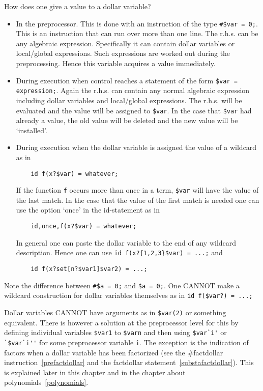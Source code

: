 How does one give a value to a dollar variable?
\begin{itemize}
\item In the preprocessor. This is done with an instruction of the type 
\verb:#$var = 0;:. This is an instruction that can run over more than one 
line. The r.h.s. can be any algebraic expression. Specifically it can 
contain dollar variables or local/global expressions. Such 
expressions are worked out during the preprocessing. Hence this variable 
acquires a value immediately.
\item During execution when control reaches a statement of the form 
\verb:$var = expression;:. Again the r.h.s. can contain any normal 
algebraic expression including dollar variables and local/global 
expressions. The r.h.s. will be evaluated and the value will be assigned to 
\verb:$var:. In the case that \verb:$var: had already a value, the old 
value will be deleted and the new value will be `installed'.
\item During execution when the dollar variable is assigned the value of a 
wildcard as in
\begin{verbatim}
    id f(x?$var) = whatever;
\end{verbatim}
If the function \verb:f: 
occurs more than once in a term, \verb:$var: will have the value of the 
last match. In the case that the value of the first match is needed one can 
use the option `once' in the id-statement as in
\begin{verbatim}
    id,once,f(x?$var) = whatever;
\end{verbatim}
In general one can paste the dollar variable to the end of any 
wildcard description. Hence one can use \verb:id f(x?{1,2,3}$var) = ...;: 
and
\begin{verbatim}
    id f(x?set[n?$var1]$var2) = ...;
\end{verbatim}
\end{itemize}
Note the difference between \verb:#$a = 0;: and \verb:$a = 0;:. One CANNOT 
make a wildcard construction for dollar variables 
themselves as in \verb:id f($var?) = ...;:

Dollar variables CANNOT have arguments as in \verb:$var(2): or something 
equivalent. There is however a solution at the preprocessor level for this 
by defining individual variables \verb:$var1: to \verb:$varn: and then 
using \verb:$var`i': or \verb:`$var`i'': for some preprocessor variable 
\verb:i:. The exception is the indication of factors when a dollar variable 
has been factorized (see the \#factdollar instruction~\ref{prefactdollar} 
and the factdollar statement~\ref{substafactdollar}). This is explained 
later in this chapter and in the chapter about 
polynomials~\ref{polynomials}.

